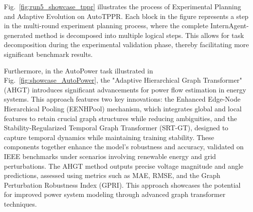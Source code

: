\documentclass{article}
\begin{document}
Fig.~\ref{fig:run5_showcase_tppr} illustrates the process of Experimental Planning and Adaptive Evolution on AutoTPPR. Each block in the figure represents a step in the multi-round experiment planning process, where the complete InternAgent-generated method is decomposed into multiple logical steps. This allows for task decomposition during the experimental validation phase, thereby facilitating more significant benchmark results. 

Furthermore, in the AutoPower task illustrated in Fig.~\ref{fig:showcase_AutoPower}, the "Adaptive Hierarchical Graph Transformer" (AHGT) introduces significant advancements for power flow estimation in energy systems. This approach features two key innovations: the Enhanced Edge-Node Hierarchical Pooling (EENHPool) mechanism, which integrates global and local features to retain crucial graph structures while reducing ambiguities, and the Stability-Regularized Temporal Graph Transformer (SRT-GT), designed to capture temporal dynamics while maintaining training stability. These components together enhance the model's robustness and accuracy, validated on IEEE benchmarks under scenarios involving renewable energy and grid perturbations. The AHGT method outputs precise voltage magnitude and angle predictions, assessed using metrics such as MAE, RMSE, and the Graph Perturbation Robustness Index (GPRI). This approach showcases the potential for improved power system modeling through advanced graph transformer techniques.
\end{document}
